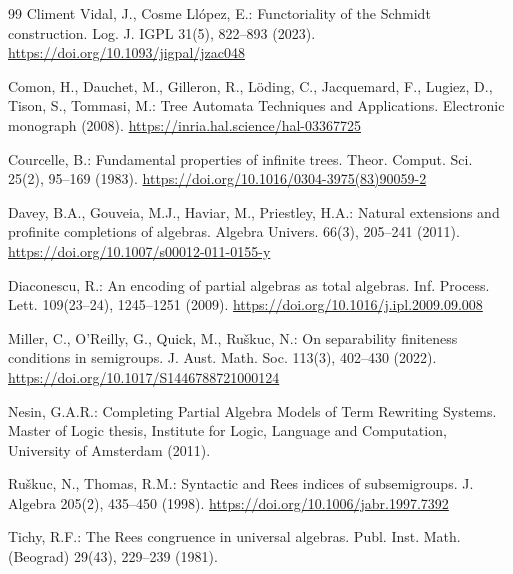 \documentclass{birkau}
\theoremstyle{definition}
\theoremstyle{remark}
\begin{document}
\begin{thebibliography}{99}
Climent Vidal, J., Cosme Ll\'opez, E.: Functoriality of the Schmidt
construction. Log. J. IGPL 31(5), 822--893 (2023).
\url{https://doi.org/10.1093/jigpal/jzac048}

Comon, H., Dauchet, M., Gilleron, R., L\"oding, C., Jacquemard, F., Lugiez, D.,
Tison, S., Tommasi, M.: Tree Automata Techniques and Applications. Electronic
monograph (2008). \url{https://inria.hal.science/hal-03367725}

Courcelle, B.: Fundamental properties of infinite trees. Theor. Comput. Sci.
25(2), 95--169 (1983). \url{https://doi.org/10.1016/0304-3975(83)90059-2}

Davey, B.A., Gouveia, M.J., Haviar, M., Priestley, H.A.: Natural extensions and
profinite completions of algebras. Algebra Univers. 66(3), 205--241 (2011).
\url{https://doi.org/10.1007/s00012-011-0155-y}

Diaconescu, R.: An encoding of partial algebras as total algebras. Inf. Process.
Lett. 109(23--24), 1245--1251 (2009).
\url{https://doi.org/10.1016/j.ipl.2009.09.008}

Miller, C., O'Reilly, G., Quick, M., Ru\v{s}kuc, N.: On separability finiteness
conditions in semigroups. J. Aust. Math. Soc. 113(3), 402--430 (2022).
\url{https://doi.org/10.1017/S1446788721000124}

Nesin, G.A.R.: Completing Partial Algebra Models of Term Rewriting Systems.
Master of Logic thesis, Institute for Logic, Language and Computation,
University of Amsterdam (2011).

Ru\v{s}kuc, N., Thomas, R.M.: Syntactic and Rees indices of subsemigroups.
J. Algebra 205(2), 435--450 (1998).
\url{https://doi.org/10.1006/jabr.1997.7392}

Tichy, R.F.: The Rees congruence in universal algebras. Publ. Inst. Math.
(Beograd) 29(43), 229--239 (1981).

\end{thebibliography}
\end{document}
